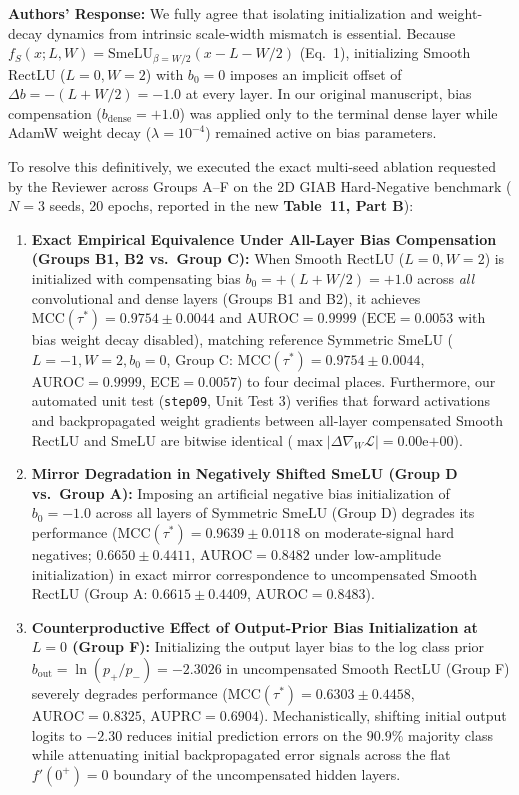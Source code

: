 \documentclass[11pt,a4paper]{article}
\newcommand{\authorsresponse}{\noindent\textbf{Authors' Response: }}
\begin{document}
\authorsresponse We fully agree that isolating initialization and weight-decay dynamics from intrinsic scale-width mismatch is essential. Because $f_S(x; L, W) = \text{SmeLU}_{\beta=W/2}(x - L - W/2)$ (Eq.~1), initializing Smooth RectLU ($L=0, W=2$) with $b_0 = 0$ imposes an implicit offset of $\Delta b = -(L+W/2) = -1.0$ at every layer. In our original manuscript, bias compensation ($b_{\text{dense}}=+1.0$) was applied only to the terminal dense layer while AdamW weight decay ($\lambda = 10^{-4}$) remained active on bias parameters.

To resolve this definitively, we executed the exact multi-seed ablation requested by the Reviewer across Groups A--F on the 2D GIAB Hard-Negative benchmark ($N=3$ seeds, 20 epochs, reported in the new \textbf{Table~11, Part B}):
\begin{enumerate}
    \item \textbf{Exact Empirical Equivalence Under All-Layer Bias Compensation (Groups B1, B2 vs.\ Group C):} When Smooth RectLU ($L=0, W=2$) is initialized with compensating bias $b_0 = +(L+W/2) = +1.0$ across \textit{all} convolutional and dense layers (Groups B1 and B2), it achieves $\text{MCC}(\tau^*) = 0.9754 \pm 0.0044$ and $\text{AUROC} = 0.9999$ ($\text{ECE} = 0.0053$ with bias weight decay disabled), matching reference Symmetric SmeLU ($L=-1, W=2, b_0=0$, Group C: $\text{MCC}(\tau^*) = 0.9754 \pm 0.0044$, $\text{AUROC} = 0.9999$, $\text{ECE} = 0.0057$) to four decimal places. Furthermore, our automated unit test (\texttt{step09}, Unit Test 3) verifies that forward activations and backpropagated weight gradients between all-layer compensated Smooth RectLU and SmeLU are bitwise identical ($\max |\Delta \nabla_W \mathcal{L}| = 0.00\text{e+}00$).
    \item \textbf{Mirror Degradation in Negatively Shifted SmeLU (Group D vs.\ Group A):} Imposing an artificial negative bias initialization of $b_0 = -1.0$ across all layers of Symmetric SmeLU (Group D) degrades its performance ($\text{MCC}(\tau^*) = 0.9639 \pm 0.0118$ on moderate-signal hard negatives; $0.6650 \pm 0.4411$, $\text{AUROC} = 0.8482$ under low-amplitude initialization) in exact mirror correspondence to uncompensated Smooth RectLU (Group A: $0.6615 \pm 0.4409$, $\text{AUROC} = 0.8483$).
    \item \textbf{Counterproductive Effect of Output-Prior Bias Initialization at $L=0$ (Group F):} Initializing the output layer bias to the log class prior $b_{\text{out}} = \ln(p_+/p_-) = -2.3026$ in uncompensated Smooth RectLU (Group F) severely degrades performance ($\text{MCC}(\tau^*) = 0.6303 \pm 0.4458$, $\text{AUROC} = 0.8325$, $\text{AUPRC} = 0.6904$). Mechanistically, shifting initial output logits to $-2.30$ reduces initial prediction errors on the $90.9\%$ majority class while attenuating initial backpropagated error signals across the flat $f'(0^+)=0$ boundary of the uncompensated hidden layers.

\end{enumerate}
\end{document}

